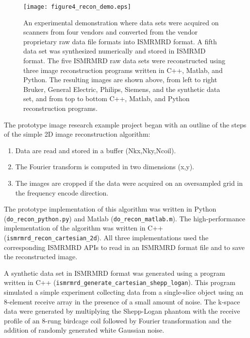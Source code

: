 \documentclass[12pt]{article}
\begin{document}
\begin{figure}
\begin{center}
\texttt{[image: figure4\_recon\_demo.eps]}
\end{center}
\caption{An experimental demonstration where data sets were acquired on scanners from four vendors and converted from the vendor proprietary raw data file formats into ISMRMRD format.  A fifth data set was synthesized numerically and stored in ISMRMD format.  The five ISMRMRD raw data sets were reconstructed using three image reconstruction programs written in C++, Matlab, and Python.  The resulting images are shown above, from left to right Bruker, General Electric, Philips, Siemens, and the synthetic data set,  and from top to bottom C++, Matlab, and Python reconstruction programs.}
\label{fig:demo}
\end{figure}

The prototype image research example project began with an outline of the steps of the simple 2D image reconstruction algorithm:
\begin{enumerate}
\item Data are read and stored in a buffer (Nkx,Nky,Ncoil).
\item The Fourier transform is computed in two dimensions (x,y).
\item The images are cropped if the data were acquired on an oversampled grid in the frequency encode direction.
\end{enumerate}
The prototype implementation of this algorithm was written in Python (\texttt{do\_recon\_python.py}) and Matlab (\texttt{do\_recon\_matlab.m}).  The high-performance implementation of the algorithm was written in C++ (\texttt{ismrmrd\_recon\_cartesian\_2d}).  All three implementations used the corresponding ISMRMRD APIs to read in an ISMRMRD format file and to save the reconstructed image.

A synthetic data set in ISMRMRD format was generated using a program written in C++ (\texttt{ismrmrd\_generate\_cartesian\_shepp\_logan}).  This program simulated a simple experiment collecting data from a single-slice object using an 8-element receive array in the presence of a small amount of noise.  The k-space data were generated by multiplying the Shepp-Logan phantom with the receive profile of an 8-rung birdcage coil followed by Fourier transformation and the addition of randomly generated white Gaussian noise.
\end{document}
